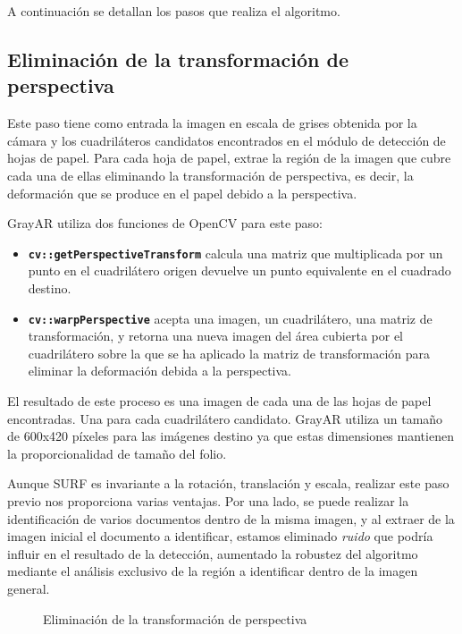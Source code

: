 A continuación se detallan los pasos que realiza el algoritmo.

\subsection{Eliminación de la transformación de perspectiva}
Este paso tiene como entrada la imagen en escala de grises obtenida
por la cámara y los cuadriláteros candidatos encontrados en el módulo
de detección de hojas de papel. Para cada hoja de papel, extrae la
región de la imagen que cubre cada una de ellas eliminando la
transformación de perspectiva, es decir, la deformación que se produce
en el papel debido a la perspectiva.

GrayAR utiliza dos funciones de OpenCV para este paso:

\begin{itemize}
\item \textbf{\texttt{cv::getPerspectiveTransform}} calcula
  una matriz que multiplicada por un punto en el cuadrilátero origen
  devuelve un punto equivalente en el cuadrado destino.

\item \textbf{\texttt{cv::warpPerspective}} acepta una
  imagen, un cuadrilátero, una matriz de transformación, y retorna una
  nueva imagen del área cubierta por el cuadrilátero sobre la que se
  ha aplicado la matriz de transformación para eliminar la deformación
  debida a la perspectiva.
\end{itemize}

El resultado de este proceso es una imagen de cada una de las hojas de
papel encontradas. Una para cada cuadrilátero candidato. GrayAR utiliza
un tamaño de 600x420 píxeles para las imágenes destino ya que estas dimensiones mantienen la proporcionalidad de tamaño del folio.

Aunque SURF es invariante a la rotación, translación y
escala, realizar este paso previo nos proporciona varias ventajas. Por
una lado, se puede realizar la identificación de varios documentos
dentro de la misma imagen, y al extraer de la imagen inicial el
documento a identificar, estamos eliminado \emph{ruido} que podría
influir en el resultado de la detección, aumentado la robustez del algoritmo mediante
el análisis exclusivo de la región a identificar dentro de la imagen
general.

\begin{figure}
\centering
{}
\caption{Eliminación de la transformación de perspectiva} \label{fig:warp}
\end{figure}



